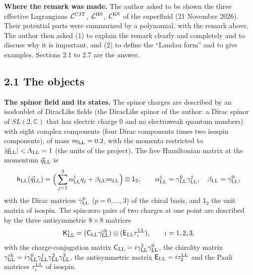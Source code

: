 \documentclass[
  10pt,
]{article}
\begin{document}
\textbf{Where the remark was made.} The author asked to be shown the
three effective Lagrangians \(\mathcal L^{\rm CJT}\),
\(\mathcal L^{\rm HS}\), \(\mathcal L^{\rm KS}\) of the superfluid (21
November 2026). Their potential parts were summarized by a polynomial,
with the remark above. The author then asked (1) to explain the remark
clearly and completely and to discuss why it is important, and (2) to
define the ``Landau form'' and to give examples. Sections 2.1 to 2.7 are
the answer.

\hypertarget{the-objects}{%
\subsection{2.1 The objects}\label{the-objects}}

\textbf{The spinor field and its states.} The spinor charges are
described by an isodoublet of DiracLike fields (the DiracLike spinor of
the author: a Dirac spinor of \(SL(2,\mathbb C)\) that has electric
charge 0 and no electroweak quantum numbers) with eight complex
components (four Dirac components times two isospin components), of mass
\(m_{\rm LL}=0.2\), with the momenta restricted to
\(\lvert\vec q_{\rm LL}\rvert<\Lambda_{\rm LL}=1\) (the units of the
project). The free Hamiltonian matrix at the momentum
\(\vec q_{\rm LL}\) is
\[\mathsf h_{\rm LL}(\vec q_{\rm LL})=\Big(\sum_{j=1}^3\alpha^j_{\rm LL}q_j+\beta_{\rm LL}m_{\rm LL}\Big)\otimes\mathsf 1_2,\qquad\alpha^j_{\rm LL}=\gamma^0_{\rm LL}\gamma^j_{\rm LL},\quad\beta_{\rm LL}=\gamma^0_{\rm LL},\]
with the Dirac matrices \(\gamma^p_{\rm LL}\) (\(p=0,\dots,3\)) of the
chiral basis, and \(\mathsf 1_2\) the unit matrix of isospin. The
spin-zero pairs of two charges at one point are described by the three
antisymmetric \(8\times8\) matrices
\[\mathsf K^\iota_{\rm LL}=(\mathsf C_{\rm LL}\gamma^{\rm ch}_{\rm LL})\otimes(\mathsf E_{\rm LL}\tau^{\rm LL}_\iota),\qquad\iota=1,2,3,\]
with the charge-conjugation matrix
\(\mathsf C_{\rm LL}=i\gamma^2_{\rm LL}\gamma^0_{\rm LL}\), the
chirality matrix
\(\gamma^{\rm ch}_{\rm LL}=i\gamma^0_{\rm LL}\gamma^1_{\rm LL}\gamma^2_{\rm LL}\gamma^3_{\rm LL}\),
the antisymmetric matrix \(\mathsf E_{\rm LL}=i\tau^{\rm LL}_2\) and the
Pauli matrices \(\tau^{\rm LL}_\iota\) of isospin.
\end{document}
